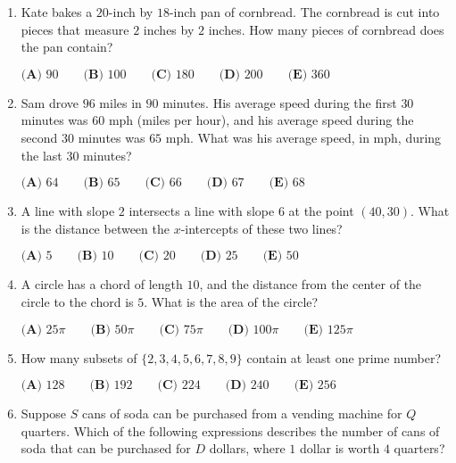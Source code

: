 \documentclass{article}
\begin{document}
\begin{enumerate}[label=\arabic*., itemsep=0.5em]\item Kate bakes a \(20\)-inch by \(18\)-inch pan of cornbread. The cornbread is cut into pieces that measure \(2\) inches by \(2\) inches. How many pieces of cornbread does the pan contain?

\(\textbf{(A) } 90 \qquad \textbf{(B) } 100 \qquad \textbf{(C) } 180 \qquad \textbf{(D) } 200 \qquad \textbf{(E) } 360\)\par \vspace{0.5em}\item Sam drove \(96\) miles in \(90\) minutes. His average speed during the first \(30\) minutes was \(60\) mph (miles per hour), and his average speed during the second \(30\) minutes was \(65\) mph. What was his average speed, in mph, during the last \(30\) minutes?

\(
\textbf{(A) } 64 \qquad
\textbf{(B) } 65 \qquad
\textbf{(C) } 66 \qquad
\textbf{(D) } 67 \qquad
\textbf{(E) } 68
\)\par \vspace{0.5em}\item A line with slope \(2\) intersects a line with slope \(6\) at the point \((40,30)\). What is the distance between the \(x\)-intercepts of these two lines? 

\(\textbf{(A) } 5 \qquad \textbf{(B) } 10 \qquad \textbf{(C) } 20 \qquad \textbf{(D) } 25 \qquad \textbf{(E) } 50\)\par \vspace{0.5em}\item A circle has a chord of length \(10\), and the distance from the center of the circle to the chord is \(5\). What is the area of the circle?

\(
\textbf{(A) }25\pi \qquad
\textbf{(B) }50\pi \qquad
\textbf{(C) }75\pi \qquad
\textbf{(D) }100\pi \qquad
\textbf{(E) }125\pi \qquad
\)\par \vspace{0.5em}\item How many subsets of \(\{2,3,4,5,6,7,8,9\}\) contain at least one prime number?

\(
\textbf{(A) } 128 \qquad
\textbf{(B) } 192 \qquad
\textbf{(C) } 224 \qquad
\textbf{(D) } 240 \qquad
\textbf{(E) } 256
\)\par \vspace{0.5em}\item Suppose \(S\) cans of soda can be purchased from a vending machine for \(Q\) quarters. Which of the following expressions describes the number of cans of soda that can be purchased for \(D\) dollars, where \(1\) dollar is worth \(4\) quarters?


\end{enumerate}
\end{document}
